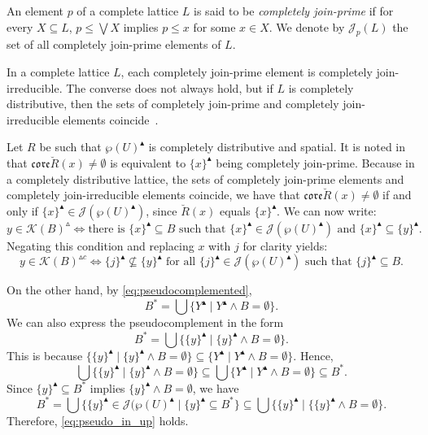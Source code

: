 \documentclass[11pt,a4paper]{amsart}
\newcommand{\UP}{\blacktriangle}
\newcommand{\Up}{\vartriangle}
\theoremstyle{plain}
\theoremstyle{definition}
\theoremstyle{remark}
\numberwithin{equation}{section}
\begin{document}
An element $p$ of a complete lattice $L$ is said to be 
\emph{completely join-prime} if for every $X \subseteq L$, $p \leq \bigvee X$ implies $p \leq x$ for some $x \in X$. 
We denote by $\mathcal{J}_p(L)$ the set of all completely
join-prime elements of $L$.

In a complete lattice $L$, each completely join-prime element is completely join-irreducible. 
The converse does not always hold, but if $L$ is completely distributive, then the sets 
of completely join-prime and completely join-irreducible elements coincide~\cite{Balachandran55}. 


Let $R$ be such that $\wp(U)^\UP$ is completely distributive 
and spatial. It is noted in \cite[Lemma~4.10]{JarRad25} 
that $\mathfrak{core}\breve{R}(x) \neq \emptyset$
is equivalent to $\{x\}^\UP$ being completely join-prime.
Because in a completely distributive lattice, the sets of
completely join-prime elements and completely join-irreducible
elements coincide, we have that $\mathfrak{core}\breve{R}(x) \neq \emptyset$ if and only if $\{x\}^\UP \in \mathcal{J}(\wp (U)^{\UP})$,
since $\breve{R}(x)$ equals $\{x\}^\UP$. We can now write:
\[ y \in \mathcal{K}(B)^\Up  \iff 
\text{there is } \{x\}^\UP \subseteq B \text{ such that }  
\{x\}^\UP \in \mathcal{J}(\wp (U)^{\UP}) \text{ and }
\{x\}^\UP \subseteq \{y\}^\UP.
\]
Negating this condition and replacing $x$ with $j$ for clarity yields:
\[ y \in \mathcal{K}(B)^{\Up c} \iff \{j\}^\UP \nsubseteq \{y\}^\UP 
\text{ for all } \{j\}^\UP \in \mathcal{J}(\wp (U)^{\UP})
\text{ such that }  \{j\}^\UP \subseteq B.
\]

On the other hand, by \eqref{eq:pseudocomplemented},
\[
B^* = \bigcup \{ Y^\UP \mid Y^\UP \wedge B = \emptyset\}. 
\]
We can also express the pseudocomplement in the form
\begin{equation} \label{eq:pseudo_in_up}
B^* = \bigcup \{ \{y\}^\UP \mid \{y\}^\UP \wedge B =\emptyset \}. 
\end{equation}
This is because
$\{\{y\}^\UP \mid \{y\}^\UP \wedge B =\emptyset\} \subseteq
 \{ Y^\UP \mid Y^\UP \wedge B =\emptyset\}$. Hence,
\[ \bigcup \{\{y\}^\UP \mid \{y\}^\UP \wedge B =\emptyset\} 
\subseteq \bigcup \{ Y^\UP \mid Y^\UP \wedge B = \emptyset\}
\subseteq B^*.\]
Since $\{y\}^\UP \subseteq B^*$ implies $\{y\}^\UP \wedge B = \emptyset$,
we have 
\[
B^* = \bigcup \{ \{y\}^\UP \in \mathcal{J}(\wp(U)^\UP \mid
\{y\}^\UP \subseteq B^* \} \subseteq  
\bigcup \{\{y\}^\UP \mid \{\{y\}^\UP \wedge B =\emptyset\}.
\]
Therefore, \eqref{eq:pseudo_in_up} holds.
\end{document}

